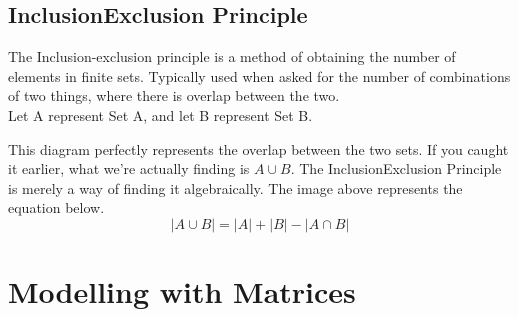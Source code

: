 \documentclass[final,1p,12pt]{elsarticle}
\begin{document}
    \subsection{Inclusion\textemdash Exclusion Principle}
    The Inclusion-exclusion principle is a method of obtaining the number of elements in finite sets.
    Typically used when asked for the number of combinations of two things, where there is overlap between the two.\\
    Let A represent Set A, and let B represent Set B.
    \begin{center}
    \end{center}
    This diagram perfectly represents the overlap between the two sets.
    If you caught it earlier, what we're actually finding is $A\cup B$.
    The Inclusion\textemdash Exclusion Principle is merely a way of finding it algebraically.
    The image above represents the equation below.
    \begin{equation*}
        |A\cup B| = |A| + |B| - |A\cap B|
    \end{equation*}
    
\section{Modelling with Matrices}
    
\end{document}
